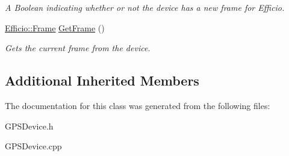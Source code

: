 \begin{DoxyCompactItemize}
\begin{DoxyCompactList}\small\item\em A Boolean indicating whether or not the device has a new frame for Efficio. \end{DoxyCompactList}\item 
\hyperlink{class_efficio_1_1_frame}{Efficio\+::\+Frame} \hyperlink{class_efficio_1_1_g_p_s_device_ac8e335e30b91e5e0a965e68701f64534}{Get\+Frame} ()\hypertarget{class_efficio_1_1_g_p_s_device_ac8e335e30b91e5e0a965e68701f64534}{}\label{class_efficio_1_1_g_p_s_device_ac8e335e30b91e5e0a965e68701f64534}

\begin{DoxyCompactList}\small\item\em Gets the current frame from the device. \end{DoxyCompactList}\end{DoxyCompactItemize}
\subsection*{Additional Inherited Members}


The documentation for this class was generated from the following files\+:\begin{DoxyCompactItemize}
\item 
G\+P\+S\+Device.\+h\item 
G\+P\+S\+Device.\+cpp\end{DoxyCompactItemize}
